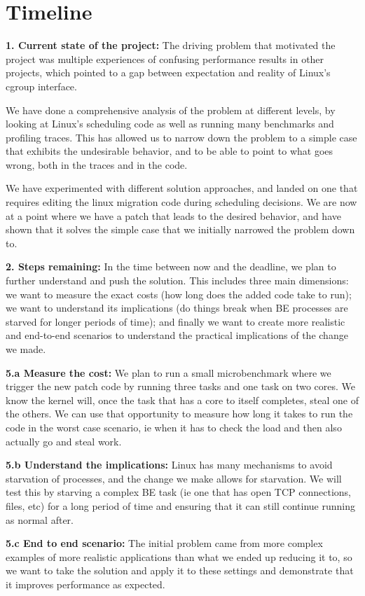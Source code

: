 
\section{Timeline}
\label{sec:timeline}

\textbf{1. Current state of the project:} 
The driving problem that motivated the project was multiple experiences of
confusing performance results in other projects, which pointed to a gap between
expectation and reality of Linux's cgroup interface. 

We have done a comprehensive analysis of the problem at different levels, by
looking at Linux's scheduling code as well as running many benchmarks and
profiling traces. This has allowed us to narrow down the problem to a simple
case that exhibits the undesirable behavior, and to be able to point to what
goes wrong, both in the traces and in the code.

We have experimented with different solution approaches, and landed on one that
requires editing the linux migration code during scheduling decisions. We are
now at a point where we have a patch that leads to the desired behavior, and
have shown that it solves the simple case that we initially narrowed the problem
down to.

\textbf{2. Steps remaining:} In the time between now and the deadline, we plan
to further understand and push the solution. This includes three main
dimensions: we want to measure the exact costs (how long does the added code
take to run); we want to understand its implications (do things break when BE
processes are starved for longer periods of time); and finally we want to create
more realistic and end-to-end scenarios to understand the practical implications
of the change we made.

\textbf{5.a Measure the cost:} We plan to run a small microbenchmark where we
trigger the new patch code by running three \schednormal{} tasks and one
\schedidle{} task on two cores. We know the kernel will, once the \schednormal{}
task that has a core to itself completes, steal one of the others. We can use
that opportunity to measure how long it takes to run the code in the worst case
scenario, ie when it has to check the load and then also actually go and steal work.

\textbf{5.b Understand the implications:} Linux has many mechanisms to avoid
starvation of processes, and the change we make allows for starvation. We will
test this by starving a complex BE task (ie one that has open TCP connections,
files, etc) for a long period of time and ensuring that it can still continue
running as normal after.

\textbf{5.c End to end scenario:} The initial problem came from more complex
examples of more realistic applications than what we ended up reducing it to, so
we want to take the solution and apply it to these settings and demonstrate that
it improves performance as expected.


